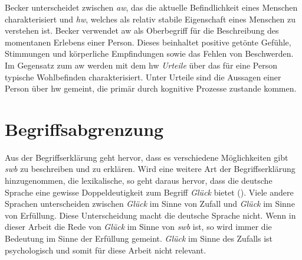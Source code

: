 Becker \cite{Becker:1994} unterscheidet zwischen \textit{\gls{aw}}, das die aktuelle Befindlichkeit eines Menschen charakterisiert und \textit{\gls{hw}}, welches als relativ stabile Eigenschaft eines Menschen zu verstehen ist. Becker verwendet \gls{aw} als Oberbegriff für die Beschreibung des momentanen Erlebens einer Person. Dieses beinhaltet positive getönte Gefühle, Stimmungen und körperliche Empfindungen sowie das Fehlen von Beschwerden. Im Gegensatz zum \gls{aw} werden mit dem \gls{hw} \textit{Urteile} über das für eine Person typische Wohlbefinden charakterisiert. Unter Urteile sind die Aussagen einer Person über \gls{hw} gemeint, die primär durch kognitive Prozesse zustande kommen.

\section{Begriffsabgrenzung}\label{abgrenzung}
Aus der Begriffserklärung geht hervor, dass es verschiedene Möglichkeiten gibt \textit{\gls{swb}} zu beschreiben und zu erklären. Wird eine weitere Art der Begriffserklärung hinzugenommen, die lexikalische, so geht daraus hervor, dass die deutsche Sprache eine gewisse Doppeldeutigkeit zum Begriff \textit{Glück} bietet (\cite{Mayring:1991}). Viele andere Sprachen unterscheiden zwischen \textit{Glück} im Sinne von Zufall und \textit{Glück} im Sinne von Erfüllung. Diese Unterscheidung macht die deutsche Sprache nicht. Wenn in dieser Arbeit die Rede von \textit{Glück} im Sinne von \textit{\gls{swb}} ist, so wird immer die Bedeutung im Sinne der Erfüllung gemeint. \textit{Glück} im Sinne des Zufalls ist psychologisch und somit für diese Arbeit nicht relevant.

